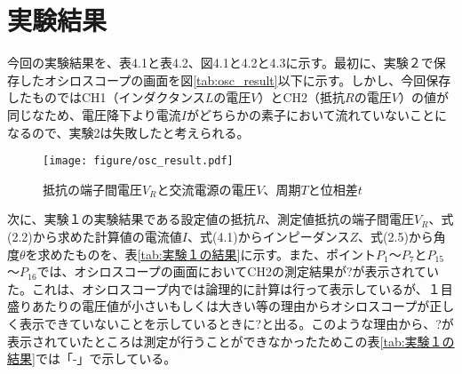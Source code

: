 \documentclass[10pt,a4paper]{jsarticle}
\numberwithin{equation}{section}
\numberwithin{figure}{section}
\numberwithin{table}{section}
\begin{document}
\section{実験結果}
  今回の実験結果を、表4.1と表4.2、図4.1と4.2と4.3に示す。最初に、実験２で保存したオシロスコープの画面を図\ref{tab:osc_result}以下に示す。しかし、今回保存したものではCH1（インダクタンス$L$の電圧$V$）とCH2（抵抗$R$の電圧$V$）の値が同じなため、電圧降下より電流$I$がどちらかの素子において流れていないことになるので、実験2は失敗したと考えられる。
  \begin{figure}[H]
    \centering
      \texttt{[image: figure/osc\_result.pdf]}
      \caption{抵抗の端子間電圧$V_R$と交流電源の電圧$V$、周期$T$と位相差$t$}\label{fig:osc_result}
  \end{figure}

  \newpage
  次に、実験１の実験結果である設定値の抵抗$R$、測定値抵抗の端子間電圧$V_R$、式(2.2)から求めた計算値の電流値$I$、式(4.1)からインピーダンス$Z$、式(2.5)から角度$\theta$を求めたものを、表\ref{tab:実験１の結果}に示す。また、ポイント$P_1$～$P_7$と$P_{15}$～$P_{16}$では、オシロスコープの画面においてCH2の測定結果が?が表示されていた。これは、オシロスコープ内では論理的に計算は行って表示しているが、１目盛りあたりの電圧値が小さいもしくは大きい等の理由からオシロスコープが正しく表示できていないことを示しているときに?と出る。このような理由から、?が表示されていたところは測定が行うことができなかったためこの表\ref{tab:実験１の結果}では「-」で示している。
\end{document}
